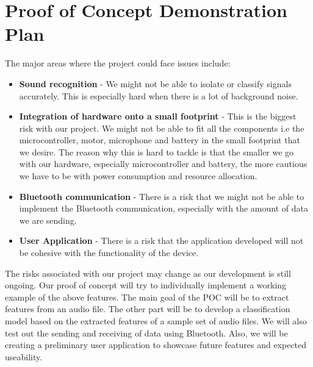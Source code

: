 \documentclass{article}
\begin{document}
\section{Proof of Concept Demonstration Plan}

The major areas where the project could face issues include: 
\begin{itemize}
	\item \textbf{Sound recognition} - We might not be able to isolate or classify signals accurately. This is especially hard when there is a lot of background noise. 
	\item \textbf{Integration of hardware onto a small footprint} - This is the biggest risk with our project. We might not be able to fit all the components i.e the microcontroller, motor, microphone and battery in the small footprint that we desire. The reason why this is hard to tackle is that the smaller we go with our hardware, especially microcontroller and battery, the more cautious we have to be with power consumption and resource allocation. 
	\item \textbf{Bluetooth communication} - There is a  risk that we might not be able to implement the Bluetooth communication, especially with the amount of data we are sending.  
	\item \textbf{User Application} - There is a risk that the application developed will not be cohesive with the functionality of the device. 
\end{itemize} 
The risks associated with our project may change as our development is still ongoing. 
Our proof of concept will try to individually implement a working example of the above features. The main goal of the POC will be to extract features from an audio file. The other part will be to develop a classification model based on the extracted features of a sample set of audio files.
We will also test out the sending and receiving of data using Bluetooth. Also, we will be creating a preliminary user application to showcase future features and expected useability. 
\end{document}

